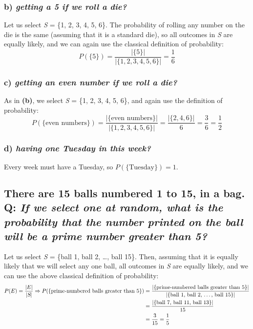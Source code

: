 \documentclass{article}
\begin{document}
\subsubsection*{b) {\em getting a 5 if we roll a die?}}
Let us select \textsl{S} = \{1, 2, 3, 4, 5, 6\}. The probability of rolling any number on the die is the same (assuming that it is a standard die), so all outcomes in \textsl{S} are equally likely, and we can again use the classical definition of probability:
\begin{equation*}
P(\{5\})=\dfrac{|\{5\}|}{|\{1, 2, 3, 4, 5, 6\}|}=\dfrac{1}{6}
\end{equation*}

\subsubsection*{c) {\em getting an even number if we roll a die?}}
As in \textbf{(b)}, we select \textsl{S} = \{1, 2, 3, 4, 5, 6\}, and again use the definition of probability:
\begin{equation*}
P(\{\text{even numbers}\})=\dfrac{|\{\text{even numbers}\}|}{|\{1, 2, 3, 4, 5, 6\}|}=\dfrac{|\{2,4,6\}|}{6}=\dfrac{3}{6}=\dfrac{1}{2}
\end{equation*}

\subsubsection*{d) {\em having one Tuesday in this week?}}
Every week must have a Tuesday, so $P(\{\text{Tuesday}\})=1$.

\subsection*{{\normalsize There are 15 balls numbered 1 to 15, in a bag.}\\
Q: {\em If we select one at random, what is the probability that the number printed on the ball will be a prime number greater than 5?}}
Let us select \textsl{S} = \{ball 1, ball 2, \ldots, ball 15\}. Then, assuming that it is equally likely that we will select any one ball, all outcomes in \textsl{S} are equally likely, and we can use the above classical definition of probability:
\begin{align*}
P(E)=\dfrac{|E|}{|\textsl{S}|}\Rightarrow P(\{\text{prime-numbered balls greater than 5}\})& =\dfrac{|\{\text{prime-numbered balls greater than 5}\}|}{|\{\text{ball 1, ball 2, \ldots, ball 15}\}|}\\
& =\dfrac{|\{\text{ball 7, ball 11, ball 13}\}|}{15}\\
& =\dfrac{3}{15}=\dfrac{1}{5}
\end{align*}
\end{document}
